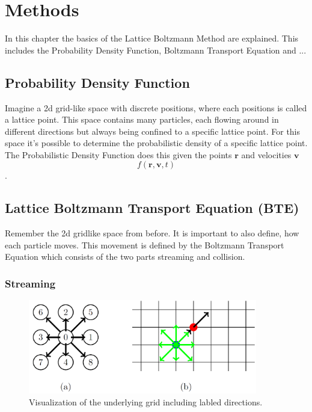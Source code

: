 \chapter{Methods}
In this chapter the basics of the Lattice Boltzmann Method are explained.
This includes the Probability Density Function, Boltzmann Transport Equation and ...


\section{Probability Density Function}
Imagine a 2d grid-like space with discrete positions, where each positions is called a lattice point.
This space contains many particles, each flowing around in different directions but always being confined to a specific lattice point.
For this space it's possible to determine the probabilistic density of a specific lattice point.
The Probabilistic Density Function does this given the points \(\mathbf r\) and velocities \(\mathbf v\)
\[f(\mathbf r ,\mathbf v,t)\].


\section{Lattice Boltzmann Transport Equation (BTE)}
Remember the 2d gridlike space from before.
It is important to also define, how each particle moves.
This movement is defined by the Boltzmann Transport Equation which consists of the two parts streaming and collision.

\subsection{Streaming}

\begin{figure}[h!]
    \begin{center}
        \includegraphics[width=10cm]{logos/Gitter_LBM.png}
        \caption{Visualization of the underlying grid including labled directions.}
        \label{fig:bte}
    \end{center}
\end{figure}

